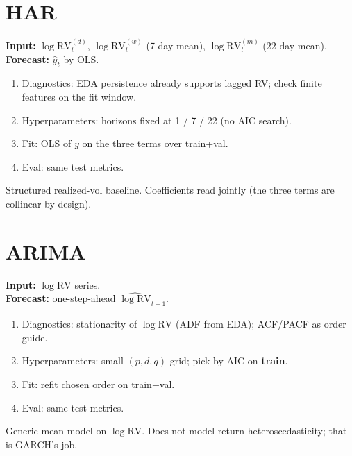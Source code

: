 \documentclass[12pt]{article}
\begin{document}
\section{HAR}
\textbf{Input:} \(\log\mathrm{RV}^{(d)}_t\), \(\log\mathrm{RV}^{(w)}_t\) (7-day mean), \(\log\mathrm{RV}^{(m)}_t\) (22-day mean).\\
\textbf{Forecast:} \(\hat y_t\) by OLS.
\begin{enumerate}
  \item Diagnostics: EDA persistence already supports lagged RV; check finite features on the fit window.
  \item Hyperparameters: horizons fixed at 1 / 7 / 22 (no AIC search).
  \item Fit: OLS of \(y\) on the three terms over train+val.
  \item Eval: same test metrics.
\end{enumerate}
\begin{explain}
Structured realized-vol baseline. Coefficients read jointly (the three terms are collinear by design).
\end{explain}

\section{ARIMA}
\textbf{Input:} \(\log\mathrm{RV}\) series.\\
\textbf{Forecast:} one-step-ahead \(\widehat{\log\mathrm{RV}}_{t+1}\).
\begin{enumerate}
  \item Diagnostics: stationarity of \(\log\mathrm{RV}\) (ADF from EDA); ACF/PACF as order guide.
  \item Hyperparameters: small \((p,d,q)\) grid; pick by AIC on \textbf{train}.
  \item Fit: refit chosen order on train+val.
  \item Eval: same test metrics.
\end{enumerate}
\begin{explain}
Generic mean model on \(\log\mathrm{RV}\). Does not model return heteroscedasticity; that is GARCH's job.
\end{explain}
\end{document}

